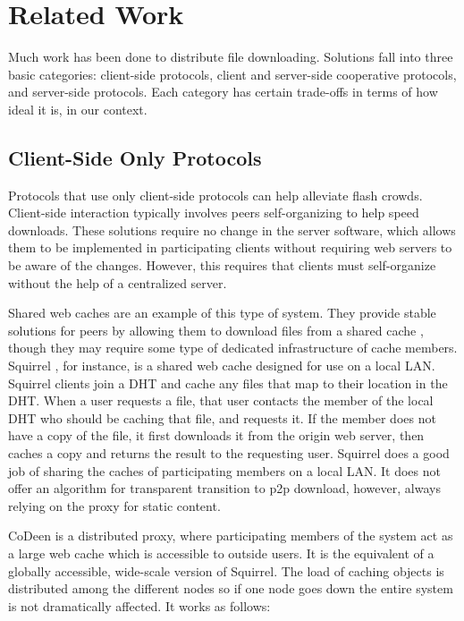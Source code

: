 \section{Related Work}\label{section:related_work}
Much work has been done to distribute file downloading.  Solutions fall into three basic categories:  client-side protocols, client and server-side cooperative protocols, and server-side protocols.  Each category has certain trade-offs in terms of how ideal it is, in our context.

\subsection{Client-Side Only Protocols}
Protocols that use only client-side protocols can help alleviate flash crowds.  Client-side interaction typically involves peers self-organizing to help speed downloads.  These solutions require no change in the server software, which allows them to be implemented in participating clients without requiring web servers to be aware of the changes.  However, this requires that clients must self-organize without the help of a centralized server.

Shared web caches are an example of this type of system.  They provide stable solutions for peers by allowing them to download files from a shared cache \cite{coral} \cite{codeen}, though they may require some type of dedicated infrastructure of cache members.  Squirrel \cite{squirrel}, for instance, is a shared web cache designed for use on a local LAN.  Squirrel clients join a DHT and cache any files that map to their location in the DHT.  When a user requests a file, that user contacts the member of the local DHT who should be caching that file, and requests it.  If the member does not have a copy of the file, it first downloads it from the origin web server, then caches a copy and returns the result to the requesting user.  Squirrel does a good job of sharing the caches of participating members on a local LAN.  It does not offer an algorithm for transparent transition to p2p download, however, always relying on the proxy for static content.

CoDeen \cite{codeen} \cite{coblitz} is a distributed proxy, where participating members of the system act as a large web cache which is accessible to outside users.  It is the equivalent of a globally accessible, wide-scale version of Squirrel.  The load of caching objects is distributed among the different nodes so if one node goes down the entire system is not dramatically affected.
It works as follows:

